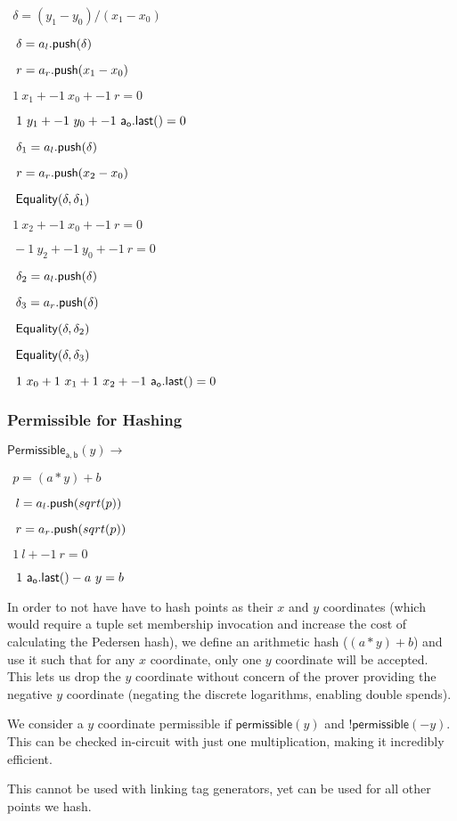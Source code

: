 \documentclass[]{article}
\begin{document}
$~~\delta = (y_1 - y_0) / (x_1 - x_0)$

$~~\delta = a_l\mathsf{.push}(\delta)$

$~~r = a_r\mathsf{.push}(x_1 - x_0)$

$~~1 ~x_1 + -1 ~x_0 + -1 ~r = 0$

$~~1 ~y_1 + -1 ~y_0 + -1 ~\mathsf{a_o.last()} = 0$

$~~\delta_1 = a_l\mathsf{.push}(\delta)$

$~~r = a_r\mathsf{.push}(x_2 - x_0)$

$~~\mathsf{Equality}(\delta, \delta_1)$

$~~1 ~x_2 + -1 ~x_0 + -1 ~r = 0$

$~~-1 ~y_2 + -1 ~y_0 + -1 ~r = 0$

$~~\delta_2 = a_l\mathsf{.push}(\delta)$

$~~\delta_3 = a_r\mathsf{.push}(\delta)$

$~~\mathsf{Equality}(\delta, \delta_2)$

$~~\mathsf{Equality}(\delta, \delta_3)$

$~~1 ~x_0 + 1 ~x_1 + 1 ~x_2 + -1 ~\mathsf{a_o.last()} = 0$

\subsubsection{Permissible for Hashing}

\newcommand{\permissible}{\mathsf{Permissible_{a, b}}}

$\permissible(y) \rightarrow$

$~~p = (a * y) + b$

$~~l = a_l\mathsf{.push}(sqrt(p))$

$~~r = a_r\mathsf{.push}(sqrt(p))$

$~~1 ~l + -1 ~r = 0$

$~~1 ~\mathsf{a_o.last()} - a ~y = b$

In order to not have have to hash points as their $x$ and $y$ coordinates (which would require a tuple set membership invocation and increase the cost of calculating the Pedersen hash), we define an arithmetic hash ($(a * y) + b$) and use it such that for any $x$ coordinate, only one $y$ coordinate will be accepted. This lets us drop the $y$ coordinate without concern of the prover providing the negative $y$ coordinate (negating the discrete logarithms, enabling double spends).

We consider a $y$ coordinate permissible if $\mathsf{permissible}(y)$ and $!\mathsf{permissible}(-y)$. This can be checked in-circuit with just one multiplication, making it incredibly efficient.

This cannot be used with linking tag generators, yet can be used for all other points we hash.
\end{document}
